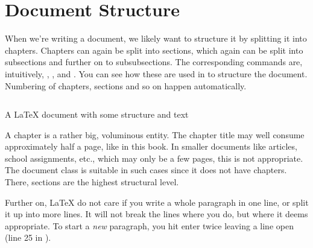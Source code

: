 \section{Document Structure}
When we're writing a document, we likely want to structure it by splitting it into chapters. Chapters can again be split into sections, which again can be split into subsections and further on to subsubsections. The corresponding commands are, intuitively, \latexin{\chapter}, \latexin{\section}, \latexin{\subsection} and \latexin{\subsubsection}. You can see how these are used in  to structure the document. Numbering of chapters, sections and so on happen automatically.

\begin{listing}
	\inputminted{latex}{latex/structure.tex}
	\caption{A \LaTeX{} document with some structure and text}
	\label{lst:latex:structure}
\end{listing}

A chapter is a rather big, voluminous entity. The chapter title may well consume approximately half a page, like in this book. In smaller documents like articles, school assignments, etc., which may only be a few pages, this is not appropriate. The   document class is suitable in such cases since it does not have chapters. There, sections are the highest structural level.

Further on, \LaTeX{} do not care if you write a whole paragraph in one line, or split it up into more lines. It will not break the lines where you do, but where it deems appropriate. To start a \emph{new} paragraph, you hit enter twice leaving a line open (line 25 in ). 

